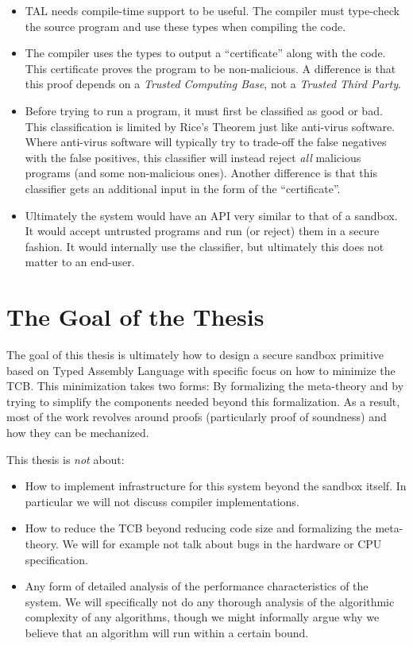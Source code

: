 \begin{itemize}
\item TAL needs compile-time support to be useful. The compiler must type-check
  the source program and use these types when compiling the code.

\item The compiler uses the types to output a ``certificate'' along with the
  code. This certificate proves the program to be non-malicious. A difference is
  that this proof depends on a \emph{Trusted Computing Base}, not a
  \emph{Trusted Third Party}.

\item Before trying to run a program, it must first be classified as good or
  bad. This classification is limited by Rice's Theorem just like anti-virus
  software. Where anti-virus software will typically try to trade-off the false
  negatives with the false positives, this classifier will instead reject
  \emph{all} malicious programs (and some non-malicious ones). Another
  difference is that this classifier gets an additional input in the form of the
  ``certificate''.

\item Ultimately the system would have an API very similar to that of a
  sandbox. It would accept untrusted programs and run (or reject) them in a
  secure fashion. It would internally use the classifier, but ultimately this
  does not matter to an end-user.
\end{itemize}

\section{The Goal of the Thesis}
\label{sec:goal}

The goal of this thesis is ultimately how to design a secure sandbox primitive
based on Typed Assembly Language with specific focus on how to minimize the
TCB. This minimization takes two forms: By formalizing the meta-theory and by
trying to simplify the components needed beyond this formalization. As a result,
most of the work revolves around proofs (particularly proof of soundness) and
how they can be mechanized.

This thesis is \emph{not} about:

\begin{itemize}
\item How to implement infrastructure for this system beyond the sandbox
  itself. In particular we will not discuss compiler implementations.
\item How to reduce the TCB beyond reducing code size and formalizing the
  meta-theory. We will for example not talk about bugs in the hardware or CPU
  specification.
\item Any form of detailed analysis of the performance characteristics of the
  system.  We will specifically not do any thorough analysis of the algorithmic
  complexity of any algorithms, though we might informally argue why we believe
  that an algorithm will run within a certain bound.
\end{itemize}

